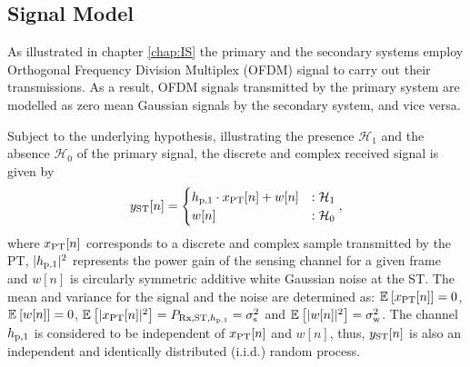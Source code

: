 

\subsection{Signal Model}
As illustrated in chapter \ref{chap:IS} the primary and the secondary systems employ Orthogonal Frequency Division Multiplex (OFDM) signal to carry out their transmissions. As a result, OFDM signals transmitted by the primary system are modelled as zero mean Gaussian signals by the secondary system, and vice versa. 

Subject to the underlying hypothesis, illustrating the presence $\mathcal H_1$ and the absence $\mathcal H_0$ of the primary signal, the discrete and complex received signal is given by 
\begin{equation}
y_{\text{ST}}[n] = 
\begin{cases}
h_{\text{p,1}} \cdot x_{\text{PT}}[n] + w[n] & : \mathcal{H}_1 \\
w[n] & :\mathcal{H}_0
\end{cases},
\label{eq:sig_mod_st}
\end{equation}
where $x_{\text{PT}}[n]$ corresponds to a discrete and complex sample transmitted by the PT, $|h_{\text{p,1}}|^2$ represents the power gain of the sensing channel for a given frame and $w[n]$ is circularly symmetric additive white Gaussian noise at the ST. 
The mean and variance for the signal and the noise are determined as: ${\mathbb E}_{}\left[ x_{\text{PT}}[n] \right] = 0$, ${\mathbb E}_{}\left[ w[n] \right] = 0$, ${\mathbb E}_{}\left[ |x_{\text{PT}}[n]|^2 \right] = P_{\text{Rx,ST,$h_{\text{p,1}}$}} = \sigma^2_{\text{s}}$ and ${\mathbb E}_{}\left[ |w[n]|^2 \right] = \sigma^2_{\text{w}}$. 
The channel $h_{\text{p,1}}$ is considered to be independent of $x_{\text{PT}}[n]$ and $w[n]$, thus, $y_{\text{ST}}[n]$ is also an independent and identically distributed (i.i.d.) random process.

